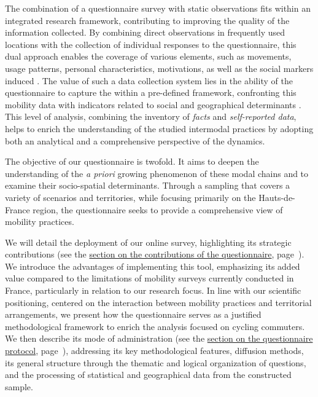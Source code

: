 \begin{refsegment}
The combination of a questionnaire survey with static observations fits within an integrated research framework, contributing to improving the quality of the information collected. By combining direct observations in frequently used locations with the collection of individual responses to the questionnaire, this dual approach enables the coverage of various elements, such as movements, usage patterns, personal characteristics, motivations, as well as the social markers induced \textcolor{blue}{\autocite[131]{dureau_lobservation_2014}}. The value of such a data collection system lies in the ability of the questionnaire to capture the  within a pre-defined framework, confronting this mobility data with indicators related to social and geographical determinants \textcolor{blue}{\autocite[68]{belfils_lepreuve_2002}}. This level of analysis, combining the inventory of \textsl{facts} and \textsl{self-reported data}, helps to enrich the understanding of the studied intermodal practices by adopting both an analytical and a comprehensive perspective of the dynamics.%

The objective of our questionnaire is twofold. It aims to deepen the understanding of the \textsl{a priori} growing phenomenon of these modal chains and to examine their socio-spatial determinants. Through a sampling that covers a variety of scenarios and territories, while focusing primarily on the Hauts-de-France region, the questionnaire seeks to provide a comprehensive view of mobility practices.%

We will detail the deployment of our online survey, highlighting its strategic contributions (see the \hyperref[chap3:apports-questionnaire-usagers]{section on the contributions of the questionnaire}, page~\pageref{chap3:apports-questionnaire-usagers}). We introduce the advantages of implementing this tool, emphasizing its added value compared to the limitations of mobility surveys currently conducted in France, particularly in relation to our research focus. In line with our scientific positioning, centered on the interaction between mobility practices and territorial arrangements, we present how the questionnaire serves as a justified methodological framework to enrich the analysis focused on cycling commuters. We then describe its mode of administration (see the \hyperref[chap3:administration-questionnaire-usagers]{section on the questionnaire protocol}, page~\pageref{chap3:administration-questionnaire-usagers}), addressing its key methodological features, diffusion methods, its general structure through the thematic and logical organization of questions, and the processing of statistical and geographical data from the constructed sample.%


\end{refsegment}
